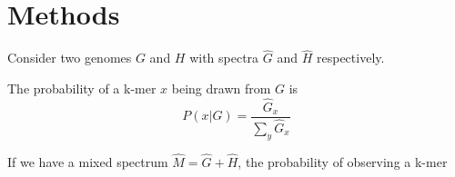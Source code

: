 \documentclass{article}
\begin{document}
\section{Methods}

Consider two genomes $G$ and $H$ with spectra $\hat{G}$ and $\hat{H}$ respectively.

The probability of a k-mer $x$ being drawn from $G$ is
$$
P(x|G) = \frac{\hat{G}_x}{\sum_y \hat{G}_x}
$$

If we have a mixed spectrum $\hat{M} = \hat{G} + \hat{H}$, the probability of observing a k-mer
\end{document}
